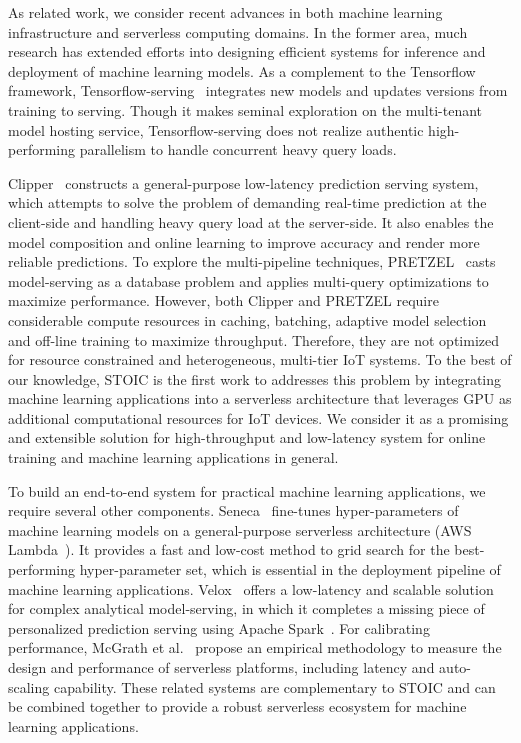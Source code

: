 As related work, we consider recent advances in both machine learning infrastructure and serverless computing domains. In the former area, much research has extended efforts into designing efficient systems for inference and deployment of machine learning models. As a complement to the Tensorflow framework, Tensorflow-serving~\cite{ref:tensorflow-serving} integrates new models and updates versions from training to serving. Though it makes seminal exploration on the multi-tenant model hosting service, Tensorflow-serving does not realize authentic high-performing parallelism to handle concurrent heavy query loads. 

Clipper~\cite{ref:clipper} constructs a general-purpose low-latency prediction serving system, which attempts to solve the problem of demanding real-time prediction at the client-side and handling heavy query load at the server-side. It also enables the model composition and online learning to improve accuracy and render more reliable predictions. To explore the multi-pipeline techniques, PRETZEL~\cite{ref:pretzel} casts model-serving as a database problem and applies multi-query optimizations to maximize performance. However, both Clipper and PRETZEL require considerable compute resources in caching, batching, adaptive model selection and off-line training to maximize throughput. Therefore, they are not optimized for resource constrained and heterogeneous, multi-tier IoT systems. 
To the best of our knowledge, STOIC is the first work to addresses this problem by integrating machine learning applications into a serverless architecture that leverages GPU as additional computational resources for IoT devices. We consider it as a promising and extensible solution for high-throughput and low-latency system for online training and machine learning applications in general. 

 To build an end-to-end system for practical machine learning applications, we require several other components. Seneca~\cite{ref:seneca} fine-tunes hyper-parameters of machine learning models on a general-purpose serverless architecture (AWS Lambda~\cite{ref:lambda}). It provides a fast and low-cost method to grid search for the best-performing hyper-parameter set, which is essential in the deployment pipeline of machine learning applications. Velox~\cite{ref:velox} offers a low-latency and scalable solution for complex analytical model-serving, in which it completes a missing piece of personalized prediction serving using Apache Spark~\cite{ref:spark}. For calibrating performance, McGrath et al.~\cite{ref:serverless} propose an empirical methodology to measure the design and performance of serverless platforms, including latency and auto-scaling capability. These related systems are complementary to STOIC and can be combined together
to provide a robust serverless ecosystem for machine learning applications.
